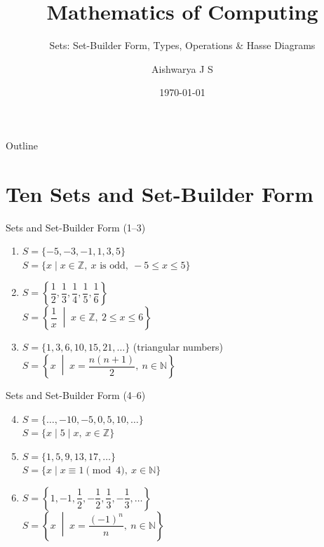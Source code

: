 \documentclass[aspectratio=169]{beamer}
\title[Sets \& Set Theory]{Mathematics of Computing}
\subtitle{Sets: Set-Builder Form, Types, Operations \& Hasse Diagrams}
\author{Aishwarya J S}
\date{\today}
\begin{document}
\begin{frame}
\titlepage
\end{frame}

\begin{frame}{Outline}
\tableofcontents
\end{frame}

\section{Ten Sets and Set-Builder Form}

\begin{frame}{Sets and Set-Builder Form (1--3)}
\small
\begin{enumerate}
\item $S=\{-5,-3,-1,1,3,5\}$ \\
$S=\{x \mid x\in \mathbb{Z},\ x \text{ is odd},\ -5\le x \le 5\}$

\bigskip
\item $S=\left\{\dfrac{1}{2},\dfrac{1}{3},\dfrac{1}{4},\dfrac{1}{5},\dfrac{1}{6}\right\}$ \\
$S=\left\{\dfrac{1}{x} \;\middle|\; x\in \mathbb{Z},\ 2\le x \le 6\right\}$

\bigskip
\item $S=\{1,3,6,10,15,21,\dots\}$ \quad (triangular numbers) \\
$S=\left\{x \;\middle|\; x=\dfrac{n(n+1)}{2},\ n\in \mathbb{N}\right\}$
\end{enumerate}
\end{frame}

\begin{frame}{Sets and Set-Builder Form (4--6)}
\small
\begin{enumerate}
\setcounter{enumi}{3}
\item $S=\{\dots,-10,-5,0,5,10,\dots\}$ \\
$S=\{x \mid 5 \mid x,\ x\in \mathbb{Z}\}$

\bigskip
\item $S=\{1,5,9,13,17,\dots\}$ \\
$S=\{x \mid x \equiv 1 \pmod{4},\ x\in \mathbb{N}\}$ \\


\bigskip
\item $S=\left\{1,-1,\dfrac{1}{2},-\dfrac{1}{2},\dfrac{1}{3},-\dfrac{1}{3},\dots\right\}$ \\
$S=\left\{x \;\middle|\; x=\dfrac{(-1)^n}{n},\ n\in \mathbb{N}\right\}$
\end{enumerate}
\end{frame}
\end{document}
